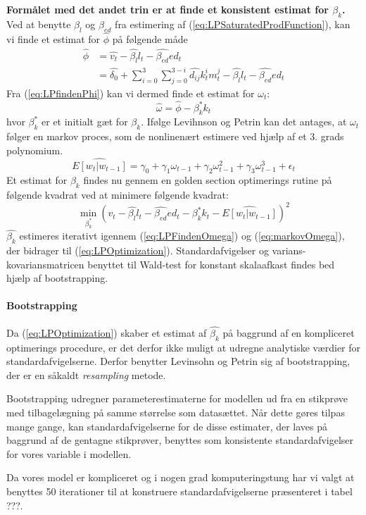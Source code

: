 \textbf{Formålet med det andet trin er at finde et konsistent estimat for $\beta_k$.} 
Ved at benytte $\beta_l$ og $\beta_{ed}$ fra estimering af (\ref{eq:LPSaturatedProdFunction}), kan vi finde et estimat for $\hat{\phi}$ på følgende måde
\begin{align}
	\hat{\phi} &= \hat{v_t} - \hat{\beta_l} l_t - \hat{\beta_{ed}} ed_t \\
	&= \hat{\delta_0} + \sum_{i=0}^{3} \sum_{j=0}^{3-i} \hat{d_{ij}} k_t^i m_t^j - \hat{\beta_l} l_t - \hat{\beta_{ed}} ed_t 
	\label{eq:LPfindenPhi}
\end{align}
Fra (\ref{eq:LPfindenPhi}) kan vi dermed finde et estimat for $\omega_t$:
\begin{equation}
	\hat{\omega} = \hat{\phi} - \beta^*_k k_t
	\label{eq:LPFindenOmega}
\end{equation}
hvor $\beta_k^*$ er et initialt gæt for $\beta_k$. Ifølge Levihnson og Petrin kan det antages, at $\omega_t$ følger en markov proces, som de nonlinenært estimere ved hjælp af et 3. grads polynomium.
\begin{equation}
 	\hat{E[w_t | w_{t-1}]} = \gamma_0 + \gamma_1 \omega_{t-1} + \gamma_2 \omega^2_{t-1} + \gamma_3 \omega^3_{t-1} + \epsilon_t
 	\label{eq:markovOmega}
 \end{equation} 
Et estimat for $\beta_k$ findes nu gennem en golden section optimerings rutine på følgende kvadrat ved at minimere følgende kvadrat:
\begin{equation}
	\min_{\beta^*_k} 
	\left( 
		v_t - \hat{\beta_l} l_t - \hat{\beta_{ed}} ed_t 
		- \beta^*_k k_t - \hat{E[w_t | w_{t-1}]} 
	\right)^2
	\label{eq:LPOptimization}
\end{equation}
$\hat{\beta_k}$ estimeres iterativt igennem (\ref{eq:LPFindenOmega}) og (\ref{eq:markovOmega}), der bidrager til (\ref{eq:LPOptimization}). Standardafvigelser og varians-kovariansmatricen benyttet til Wald-test for konstant skalaafkast findes bed hjælp af bootstrapping.

\paragraph{Bootstrapping}
Da (\ref{eq:LPOptimization}) skaber et estimat af $\hat{\beta_k}$ på baggrund af en kompliceret optimerings procedure, er det derfor ikke muligt at udregne analytiske værdier for standardafvigelserne. Derfor benytter Levinsohn og Petrin sig af bootstrapping, der er en såkaldt \emph{resampling} metode.

Bootstrapping udregner parameterestimaterne for modellen ud fra en stikprøve med tilbagelægning på samme størrelse som datasættet. Når dette gøres tilpas mange gange, kan standardafvigelserne for de disse estimater, der laves på baggrund af de gentagne stikprøver, benyttes som konsistente standardafvigelser for vores variable i modellen.

Da vores model er kompliceret og i nogen grad komputeringstung har vi valgt at benyttes 50 iterationer til at konstruere standardafvigelserne præsenteret i tabel ???.